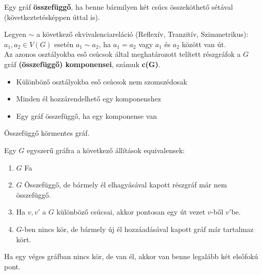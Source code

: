 \begin{frame}
\begin{tcolorbox}[title={Def.: Összeföggőség}]
Egy gráf \textbf{összefüggő}, ha benne bármilyen két csúcs összeköthető sétával (következtetésképpen úttal is).
\end{tcolorbox}
\begin{tcolorbox}[title={Def.: Komponensek}]
Legyen $\sim$ a következő ekvivalenciareláció (Reflexív, Tranzitív, Szimmetrikus):\\
\mbigskip
$a_1, a_2 \in V(G)$ esetén $a_1 \sim a_2$, ha $a_1 = a_2$ vagy $a_1$ és $a_2$ között van út.\\
\mbigskip
Az azonos osztályokba eső csúcsok által meghatározott telített részgráfok a $G$ gráf \textbf{(összefüggő) komponensei}, számuk \textbf{c(G)}.
\end{tcolorbox}
\begin{tcolorbox}[title={Ész}]
\begin{itemize}
\item Különböző osztályokba eső csúcsok nem szomszédosak
\item Minden él hozzárendelhető egy komponenshez
\item Egy gráf összefüggő, ha egy komponense van
\end{itemize}
\end{tcolorbox}
\end{frame}

\begin{frame}
\begin{tcolorbox}[title={Def.: Fa}]
Összefüggő körmentes gráf.
\end{tcolorbox}
\end{frame}

\begin{frame}
\begin{tcolorbox}[title={Tétel: Equivalens állítások fákra}]
Egy $G$ egyszerű gráfra a következő állítások equivalensek:
\begin{enumerate}
\item $G$ Fa
\item $G$ Összefüggő, de bármely él elhagyásával kapott részgráf már nem összefüggő.
\item Ha $v, v'$ a $G$ különböző csúcsai, akkor pontosan egy út vezet $v$-ből $v'$be.
\item $G$-ben nincs kör, de bármely új él hozzáadásával kapott gráf már tartalmaz kört.
\end{enumerate}
\end{tcolorbox}

\begin{tcolorbox}[title={Tétel: Elsőfokú pontok}]
Ha egy véges gráfban nincs kör, de van él, akkor van benne legalább két elsőfokú pont.
\end{tcolorbox}
\end{frame}

